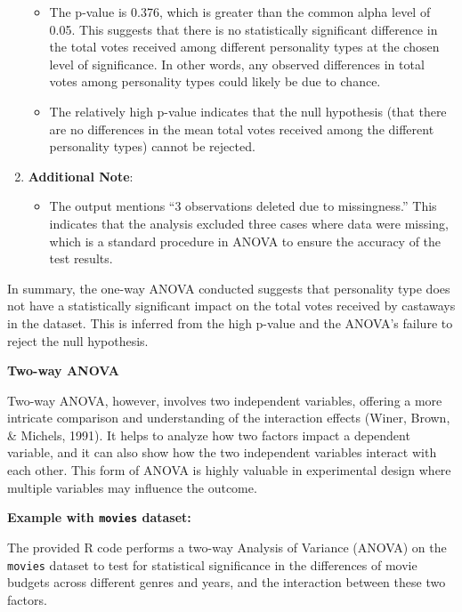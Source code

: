 \documentclass[
]{book}
\providecommand{\tightlist}{%
  \setlength{\itemsep}{0pt}\setlength{\parskip}{0pt}}
\begin{document}
\begin{enumerate}
  \begin{itemize}
  \tightlist
  \item
    The p-value is 0.376, which is greater than the common alpha level of 0.05. This suggests that there is no statistically significant difference in the total votes received among different personality types at the chosen level of significance. In other words, any observed differences in total votes among personality types could likely be due to chance.
  \item
    The relatively high p-value indicates that the null hypothesis (that there are no differences in the mean total votes received among the different personality types) cannot be rejected.
  \end{itemize}
\item
  \textbf{Additional Note}:

  \begin{itemize}
  \tightlist
  \item
    The output mentions ``3 observations deleted due to missingness.'' This indicates that the analysis excluded three cases where data were missing, which is a standard procedure in ANOVA to ensure the accuracy of the test results.
  \end{itemize}
\end{enumerate}

In summary, the one-way ANOVA conducted suggests that personality type does not have a statistically significant impact on the total votes received by castaways in the dataset. This is inferred from the high p-value and the ANOVA's failure to reject the null hypothesis.

\textbf{Two-way ANOVA}

Two-way ANOVA, however, involves two independent variables, offering a more intricate comparison and understanding of the interaction effects (Winer, Brown, \& Michels, 1991). It helps to analyze how two factors impact a dependent variable, and it can also show how the two independent variables interact with each other. This form of ANOVA is highly valuable in experimental design where multiple variables may influence the outcome.

\textbf{Example with \texttt{movies} dataset:}

The provided R code performs a two-way Analysis of Variance (ANOVA) on the \texttt{movies} dataset to test for statistical significance in the differences of movie budgets across different genres and years, and the interaction between these two factors.
\end{document}
